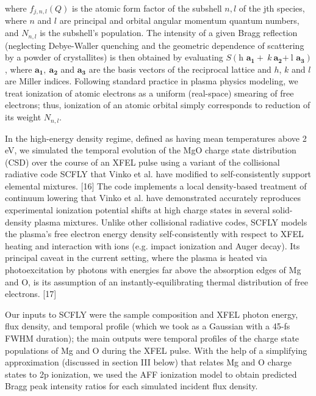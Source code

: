 where \(f_{j,n,l}\left( Q \right)\) is the atomic form factor of the
subshell \(n,l\) of the jth species, where \(n\) and \(l\) are principal
and orbital angular momentum quantum numbers, and \(N_{n,l}\) is the
subshell's population. The intensity of a given Bragg reflection
(neglecting Debye-Waller quenching and the geometric dependence of
scattering by a powder of crystallites) is then obtained by evaluating
\(S\left( \text{h\ }\mathbf{a}_{\mathbf{1}} + \ k\ \mathbf{a}_{\mathbf{2}}\mathbf{+ \ }\text{l\ }\mathbf{a}_{\mathbf{3}} \right)\),
where \(\mathbf{a}_{\mathbf{1}}\mathbf{,\ }\mathbf{a}_{\mathbf{2}}\) and
\(\mathbf{a}_{\mathbf{3}}\) are the basis vectors of the reciprocal
lattice and \(h\), \(k\) and \(l\) are Miller indices. Following
standard practice in plasma physics modeling, we treat ionization of
atomic electrons as a uniform (real-space) smearing of free electrons;
thus, ionization of an atomic orbital simply corresponds to reduction of
its weight \(N_{n,l}\).

In the high-energy density regime, defined as having mean temperatures
above 2 eV, we simulated the temporal evolution of the MgO charge state
distribution (CSD) over the course of an XFEL pulse using a variant of
the collisional radiative code SCFLY that Vinko et al. have modified to
self-consistently support elemental mixtures. {[}16{]} The code
implements a local density-based treatment of continuum lowering that
Vinko et al. have demonstrated accurately reproduces experimental
ionization potential shifts at high charge states in several
solid-density plasma mixtures. Unlike other collisional radiative codes,
SCFLY models the plasma's free electron energy density self-consistently
with respect to XFEL heating and interaction with ions (e.g. impact
ionization and Auger decay). Its principal caveat in the current
setting, where the plasma is heated via photoexcitation by photons with
energies far above the absorption edges of Mg and O, is its assumption
of an instantly-equilibrating thermal distribution of free electrons.
{[}17{]}

Our inputs to SCFLY were the sample composition and XFEL photon energy,
flux density, and temporal profile (which we took as a Gaussian with a
45-fs FWHM duration); the main outputs were temporal profiles of the
charge state populations of Mg and O during the XFEL pulse. With the
help of a simplifying approximation (discussed in section III below)
that relates Mg and O charge states to 2p ionization, we used the AFF
ionization model to obtain predicted Bragg peak intensity ratios for
each simulated incident flux density.

